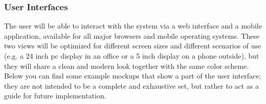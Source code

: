 \subsubsection{User Interfaces}

The user will be able to interact with the system via a web interface and a mobile application, available for all major browsers and mobile operating systems. These two views will be optimized for different screen sizes and different scenarios of use (e.g. a 24 inch pc display in an office or a 5 inch display on a phone outside), but they will share a clean and modern look together with the same color scheme. \\
Below you can find some example mockups that show a part of the user interface; they are not intended to be a complete and exhaustive set, but rather to act as a guide for future implementation.
\\ [0.5 cm]

